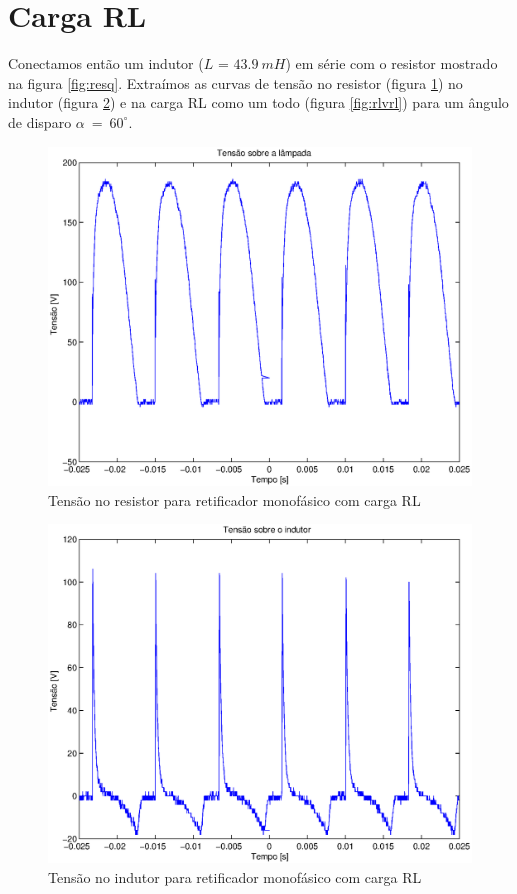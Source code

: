 \documentclass{article}
\begin{document}
\section{Carga RL}
Conectamos então um indutor ($L$ = $43.9\ mH$) em série com o resistor mostrado na figura \ref{fig:resq}. Extraímos as curvas de tensão no resistor (figura \ref{fig:rlvr}) no indutor (figura \ref{fig:rlvl}) e na carga RL como um todo (figura \ref{fig:rlvrl}) para um ângulo de disparo $\alpha\ =\ 60^\circ$.
\begin{figure}[H]
	\centering
	\includegraphics[width=0.7\linewidth]{dados/RL/rl_vr}
	\caption{Tensão no resistor para retificador monofásico com carga RL}
	\label{fig:rlvr}
\end{figure}
\begin{figure}[H]
	\centering
	\includegraphics[width=0.7\linewidth]{dados/RL/r_vl}
	\caption{Tensão no indutor para retificador monofásico com carga RL}
	\label{fig:rlvl}
\end{figure}
\end{document}
